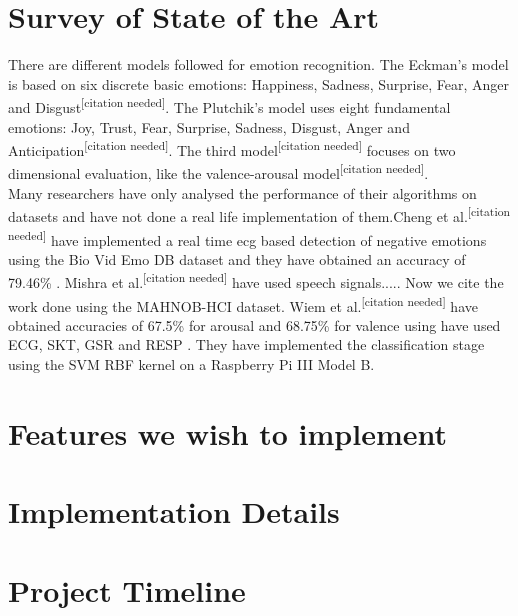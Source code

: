 \documentclass[11pt]{article}
\theoremstyle{definition}
\begin{document}
  \section{Survey of State of the Art}

There are different models followed for emotion recognition. The Eckman's model is based on six discrete basic emotions: Happiness, Sadness, Surprise, Fear, Anger and Disgust\textsuperscript{[citation needed]}. The Plutchik's model uses eight fundamental emotions: Joy, Trust, Fear, Surprise, Sadness, Disgust, Anger and Anticipation\textsuperscript{[citation needed]}. The third model\textsuperscript{[citation needed]} focuses on two dimensional evaluation, like the valence-arousal model\textsuperscript{[citation needed]}.\\

Many researchers have only analysed the performance of their algorithms on datasets and have not done a real life implementation of them.Cheng et al.\textsuperscript{[citation needed]} have implemented a real time ecg based detection of negative emotions using the Bio Vid Emo DB dataset and they have obtained an accuracy of 79.46\% . Mishra et al.\textsuperscript{[citation needed]} have used speech signals.....
Now we cite the work done using the MAHNOB-HCI dataset. Wiem et al.\textsuperscript{[citation needed]} have obtained accuracies of 67.5\% for arousal and 68.75\% for valence using have used ECG, SKT, GSR and RESP . They have implemented the classification stage using the SVM RBF kernel on a Raspberry Pi III Model B. 
    
  \section{Features we wish to implement}

  \section{Implementation Details}

  \section{Project Timeline}
  
\end{document}
